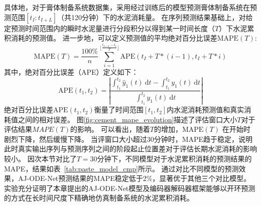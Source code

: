 具体地，对于膏体制备系统数据集，采用经过训练后的模型预测膏体制备系统在预测范围$[{t_I:t_{I+L}}]$（共120分钟）下的水泥消耗量。
在序列预测结果基础上，对给定预测时间范围内的瞬时水泥量进行分段积分以得到某一时间长度（$T$）下水泥累积消耗的预测值。
进一步地，可以定义预测值的平均绝对百分比误差$\text{MAPE}(T)$:
\begin{equation}
\text{MAPE}(T) = \frac{100\%}{n}\sum\limits_{i=1}^{\lfloor\frac{t_{I+L}-t_I}{T}\rfloor}\text{APE}(t_I+T*(i-1),t_I+T*i)
\label{equ:energy_mape}
\end{equation}
其中，绝对百分比误差（APE）定义如下：
\begin{equation}
\text{APE}(t_1,t_2) = \left|\frac{\int_{t_1}^{t_2}\hat{y}_1(t)\mathrm{~d}t-\int_{t_1}^{t_2}y_1(t)\mathrm{~d}t}{\int_{t_1}^{t_2}y_1(t)\mathrm{~d}t}\right|
\end{equation}
绝对百分比误差$\text{APE}(t_1,t_2)$衡量了时间范围$[t_1, t_2]$内水泥消耗预测值和真实消耗值之间的相对误差。
图\ref{fig:cement_mape_evolution}描述了评估窗口大小$T$对于评估结果$MAPE(T)$的影响。
可以看出，随着$T$的增加，$\text{MAPE}(T)$ 在开始时剧烈下降，然后缓慢下降。
当评窗口大小超过30分钟时，MAPE趋于稳定，说明此时真实输出序列与预测序列之间的阶段起止位置差对于评估长期水泥消耗的影响较小。
因次本节对比了$T=30$分钟下，不同模型对于水泥累积消耗的预测结果的MAPE，结果如表~\ref{tab:paste_model_cmp}所示。
通过对比不同模型的预测效果，AJ-ODE-Net预测结果的MAPE稳定低于2\%，显著优于其他三个对比模型。
实验充分证明了本章提出的AJ-ODE-Net模型及编码器解码器框架能够以开环预测的方式在长时间尺度下精确地仿真制备系统的水泥累积消耗。


